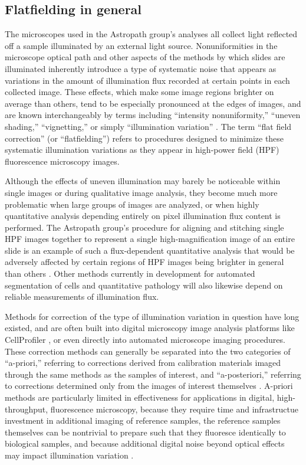 \documentclass[letterpaper,11pt]{article}
\begin{document}
\subsection{Flatfielding in general}
\label{ssec:flatfielding_in_general}

The microscopes used in the Astropath group's analyses all collect light reflected off a sample illuminated by an external light source. Nonuniformities in the microscope optical path and other aspects of the methods by which slides are illuminated inherently introduce a type of systematic noise that appears as variations in the amount of illumination flux recorded at certain points in each collected image. These effects, which make some image regions brighter on average than others, tend to be especially pronounced at the edges of images, and are known interchangeably by terms including ``intensity nonuniformity,'' ``uneven shading,'' ``vignetting,'' or simply ``illumination variation'' \cite{doi:10.1111/jmi.12178}. The term ``flat field correction'' (or ``flatfielding'') refers to procedures designed to minimize these systematic illumination variations as they appear in high-power field (HPF) fluorescence microscopy images. 

Although the effects of uneven illumination may barely be noticeable within single images or during qualitative image analysis, they become much more problematic when large groups of images are analyzed, or when highly quantitative analysis depending entirely on pixel illumination flux content is performed. The Astropath group's procedure for aligning and stitching single HPF images together to represent a single high-magnification image of an entire slide is an example of such a flux-dependent quantitative analysis that would be adversely affected by certain regions of HPF images being brighter in general than others \cite{Heshy}. Other methods currently in development for automated segmentation of cells and quantitative pathology will also likewise depend on reliable measurements of illumination flux.

Methods for correction of the type of illumination variation in question have long existed, and are often built into digital microscopy image analysis platforms like CellProfiler \cite{Carpenter2006}, or even directly into automated microscope imaging procedures. These correction methods can generally be separated into the two categories of ``a-priori,'' referring to corrections derived from calibration materials imaged through the same methods as the samples of interest, and ``a-posteriori,'' referring to corrections determined only from the images of interest themselves \cite{18770694}. A-priori methods are particularly limited in effectiveness for applications in digital, high-throughput, fluorescence microscopy, because they require time and infrastructue investment in additional imaging of reference samples, the reference samples themselves can be nontrivial to prepare such that they fluoresce identically to biological samples, and because additional digital noise beyond optical effects may impact illumination variation \cite{doi:10.1111/jmi.12178}.
\end{document}
